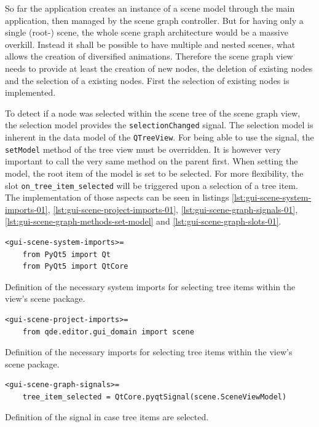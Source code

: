 \documentclass[10pt, openright, notitlepage]{scrreprt}
\begin{document}
So far the application creates an instance of a scene model through the main
application, then managed by the scene graph controller. But for having only a
single (root-) scene, the whole scene graph architecture would be a massive
overkill. Instead it shall be possible to have multiple and nested scenes, what
allows the creation of diversified animations. Therefore the scene graph view
needs to provide at least the creation of new nodes, the deletion of existing
nodes and the selection of a existing nodes. First the selection of existing
nodes is implemented.

To detect if a node was selected within the scene tree of the scene graph view,
the selection model provides the \texttt{selectionChanged} signal. The
selection model is inherent in the data model of the \texttt{QTreeView}. For
being able to use the signal, the \texttt{setModel} method of the tree view
must be overridden. It is however very important to call the very same method on
the parent first. When setting the model, the root item of the model is set to be
selected.
For more flexibility, the slot \texttt{on\_tree\_item\_selected} will be
triggered upon a selection of a tree item. The implementation of those aspects
can be seen in listings \ref{lst:gui-scene-system-imports-01},
\ref{lst:gui-scene-project-imports-01}, \ref{lst:gui-scene-graph-signals-01},
\ref{lst:gui-scene-graph-methods-set-model} and \ref{lst:gui-scene-graph-slots-01}.

\begin{listing}[H]
\begin{verbatim}
<gui-scene-system-imports>=
    from PyQt5 import Qt
    from PyQt5 import QtCore
\end{verbatim}
\caption{\label{lst:gui-scene-system-imports-01}
Definition of the necessary system imports for selecting tree items within the view's scene package.}
\end{listing}

\begin{listing}[H]
\begin{verbatim}
<gui-scene-project-imports>=
    from qde.editor.gui_domain import scene
\end{verbatim}
\caption{\label{lst:gui-scene-project-imports-01}
Definition of the necessary imports for selecting tree items within the view's scene package.}
\end{listing}

\begin{listing}[H]
\begin{verbatim}
<gui-scene-graph-signals>=
    tree_item_selected = QtCore.pyqtSignal(scene.SceneViewModel)
\end{verbatim}
\caption{\label{lst:gui-scene-graph-signals-01}
Definition of the signal in case tree items are selected.}
\end{listing}
\end{document}
